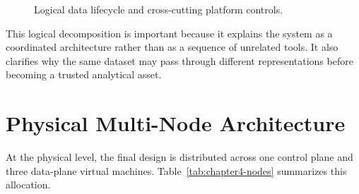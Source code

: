 \begin{figure}[H]
    \centering
    
    \caption{Logical data lifecycle and cross-cutting platform controls.}
    \label{fig:chapter4-logical-architecture}
\end{figure}

This logical decomposition is important because it explains the system as a coordinated architecture rather than as a sequence of unrelated tools. It also clarifies why the same dataset may pass through different representations before becoming a trusted analytical asset.

\section{Physical Multi-Node Architecture}
At the physical level, the final design is distributed across one control plane and three data-plane virtual machines. Table~\ref{tab:chapter4-nodes} summarizes this allocation.

